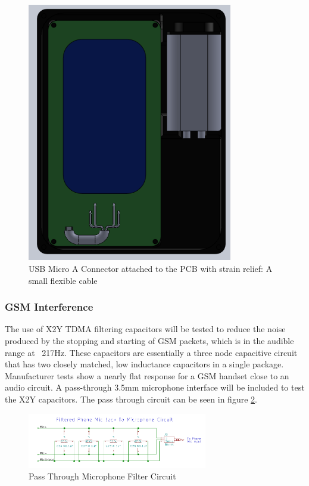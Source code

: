 \documentclass{article}
\numberwithin{figure}{section}
\numberwithin{equation}{section}
\begin{document}
{\begin{figure}[H]
	\centering
	\includegraphics[width=0.8\textwidth]{Assembly1}
	\caption{USB Micro A Connector attached to the PCB with strain relief: A small flexible cable}
	\label{fig:usbcable}
\end{figure}

\subsubsection{GSM Interference}

The use of X2Y TDMA filtering capacitors will be tested to reduce the noise produced by the stopping and starting of GSM packets, which is in the audible range at ~217Hz. These capacitors are essentially a three node capacitive circuit that has two closely matched, low inductance capacitors in a single package. Manufacturer tests show a nearly flat response for a GSM handset close to an audio circuit. A pass-through 3.5mm microphone interface will be included to test the X2Y capacitors. The pass through circuit can be seen in figure \ref{fig:x2y}.

\begin{figure}[H]
	\centering
	\includegraphics[width=0.7\textwidth]{X2Yfiltercircuit}
	\caption{Pass Through Microphone Filter Circuit}
	\label{fig:x2y}
\end{figure}

}
\end{document}
